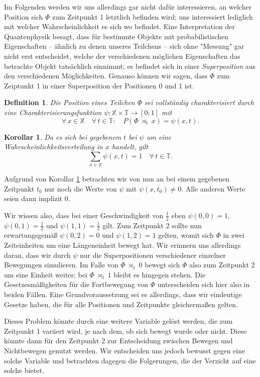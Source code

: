 \documentclass[a4paper,12pt,ngerman]{scrartcl}
\theoremstyle{plain}
\newtheorem{definition}{Definition}
\theoremstyle{plain}
\theoremstyle{plain}
\theoremstyle{plain}
\newtheorem{corollary}{Korollar}
\newcommand{\T}{\mathbb{T}}
\newcommand{\X}{\mathbb{X}}
\newcommand{\at}[1]{\;\rtimes_{#1}\;}
\begin{document}
Im Folgenden werden wir uns allerdings gar nicht dafür interessieren, an welcher Position sich $\Phi$ zum Zeitpunkt 1 letztlich befinden wird; uns interessiert lediglich mit welcher Wahrscheinlichkeit es sich wo befindet. Eine Interpretation der Quantenphysik besagt, dass für bestimmte Objekte mit probabilistischen Eigenschaften -- ähnlich zu denen unseres Teilchens -- sich ohne "Messung" gar nicht erst entscheidet, welche der verschiedenen möglichen Eigenschaften das betrachte Objekt tatsächlich einnimmt; es befindet sich in einer \textit{Superposition} aus den verschiedenen Möglichkeiten. Genauso können wir sagen, dass $\Phi$ zum Zeiptunkt 1 in einer Superposition der Positionen 0 und 1 ist.

{
\begin{definition}\label{def_psi}
Die Position eines Teilchen $\Phi$ sei vollständig charakterisiert durch eine Charakterisierungsfunktion $\psi: \X\times\T \rightarrow [0;1]$ mit
\[\forall\, x\in\X\quad\forall\, t\in\T:\quad
P(\Phi\at{t}x)=\psi(x,t).\]
\end{definition}
}

{
\begin{corollary}\label{cor_summe}
Da es sich bei gegebenem $t$ bei $\psi$ um eine Wahrscheinlichkeitsverteilung in $x$ handelt, gilt
\[\sum_{x\in\X} \psi(x,t)=1 \quad\forall\,t\in\T.\]
\end{corollary}
}

Aufgrund von Korollar \ref{cor_summe} betrachten wir von nun an bei einem gegebenen Zeitpunkt $t_0$ nur noch die Werte von $\psi$ mit $\psi(x,t_0)\neq0$. Alle anderen Werte seien dann implizit 0.

Wir wissen also, dass bei einer Geschwindigkeit von $\frac{1}{2}$  eben $\psi(0,0)=1$, $\psi(0,1)=\frac{1}{2}$ und $\psi(1,1)=\frac{1}{2}$ gilt. Zum Zeitpunkt 2 sollte nun erwartungsgemäß $\psi(0,2)=0$ und $\psi(1,2)=1$ gelten, womit sich $\Phi$ in zwei Zeiteinheiten um eine Längeneinheit bewegt hat. Wir erinnern uns allerdings daran, dass wir durch $\psi$ nur die Superpositionen verschiedener einzelner Bewegungen simulieren. Im Falle von $\Phi\at{1}0$ bewegt sich $\Phi$ also zum Zeitpunkt 2 um eine Einheit weiter; bei $\Phi\at{1}1$ bleibt es hingegen stehen. Die Gesetzesmäßigkeiten für die Fortbewegung von $\Phi$ unterscheiden sich hier also in beiden Fällen. Eine Grundvoraussetzung sei es allerdings, dass wir eindeutige Gesetze haben, die für alle Positionen und Zeitpunkte gleichermaßen gelten.

Dieses Problem könnte durch eine weitere Variable gelöst werden, die zum Zeitpunkt 1 variiert wird, je nach dem, ob sich bewegt wurde oder nicht. Diese könnte dann für den Zeitpunkt 2 zur Entscheidung zwischen Bewegen und Nichtbewegen genutzt werden. Wir entscheiden uns jedoch bewusst gegen eine solche Variable und betrachten dagegen die Folgerungen, die der Verzicht auf eine solche bietet.
\end{document}
